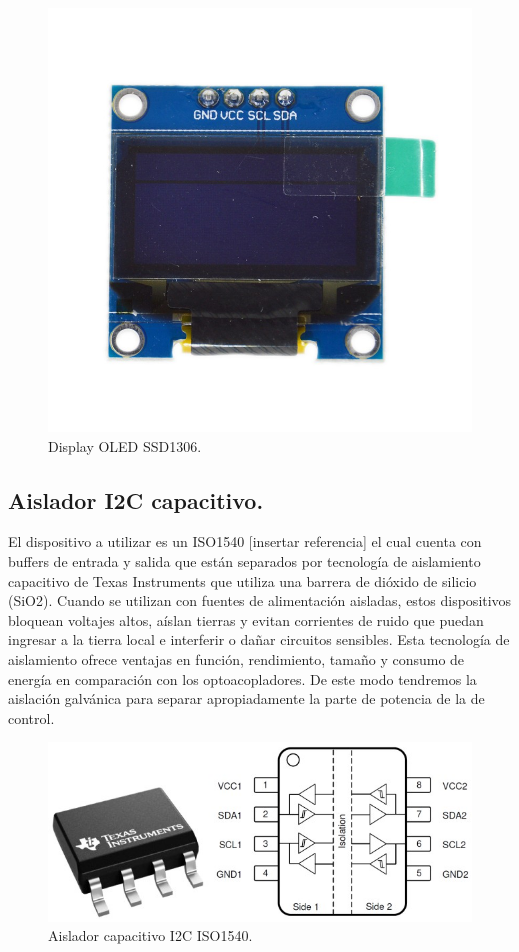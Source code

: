 \begin{figure}
    \centering
    \includegraphics[scale=0.1]{./imagenes/display.jpg}
    \caption{Display OLED SSD1306.}
    \label{F:display}
\end{figure}

\subsection{Aislador I2C capacitivo.}
El dispositivo a utilizar es un ISO1540 [insertar referencia] el cual cuenta con buffers de entrada y salida que están separados por tecnología de aislamiento capacitivo de Texas Instruments que utiliza una barrera de dióxido de silicio (SiO2). Cuando se utilizan con fuentes de alimentación aisladas, estos dispositivos bloquean voltajes altos, aíslan tierras y evitan corrientes de ruido que puedan ingresar a la tierra local e interferir o dañar circuitos sensibles. Esta tecnología de aislamiento ofrece ventajas en función, rendimiento, tamaño y consumo de energía en comparación con los optoacopladores.
De este modo tendremos la aislación galvánica para separar apropiadamente la parte de potencia de la de control.
\begin{figure}
    \centering
    \includegraphics[scale=0.1]{./imagenes/optoi2c.jpg}
    \caption{Aislador capacitivo I2C ISO1540.}
    \label{F:optoi2c}
\end{figure}


